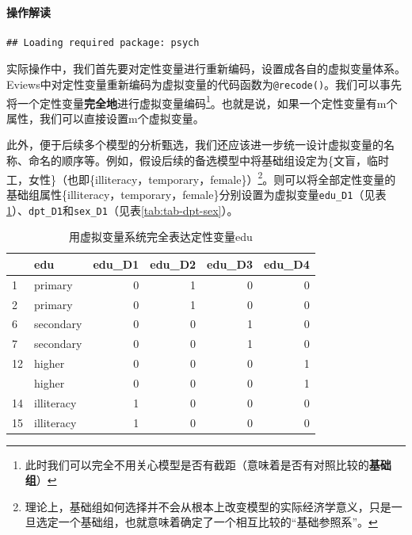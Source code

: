 \documentclass[12pt,(landscape,a4paper),(portrait,a4paper)]{article}
\let\oldparagraph\paragraph
\renewcommand{\paragraph}[1]{\oldparagraph{#1}\mbox{}}
\let\rmarkdownfootnote\footnote%
\def\footnote{\protect\rmarkdownfootnote}
\theoremstyle{definition}
\theoremstyle{definition}
\theoremstyle{definition}
\theoremstyle{remark}
\begin{document}
\paragraph{操作解读}

\begin{verbatim}
## Loading required package: psych
\end{verbatim}

实际操作中，我们首先要对定性变量进行重新编码，设置成各自的虚拟变量体系。Eviews中对定性变量重新编码为虚拟变量的代码函数为\texttt{@recode()}。我们可以事先将一个定性变量\textbf{完全地}进行虚拟变量编码\footnote{此时我们可以完全不用关心模型是否有截距（意味着是否有对照比较的\textbf{基础组}）}。也就是说，如果一个定性变量有m个属性，我们可以直接设置m个虚拟变量。

此外，便于后续多个模型的分析甄选，我们还应该进一步统一设计虚拟变量的名称、命名的顺序等。例如，假设后续的备选模型中将基础组设定为\{文盲，临时工，女性\}（也即\{illiteracy，temporary，female\}）\footnote{理论上，基础组如何选择并不会从根本上改变模型的实际经济学意义，只是一旦选定一个基础组，也就意味着确定了一个相互比较的``基础参照系''。}。则可以将全部定性变量的基础组属性\{illiteracy，temporary，female\}分别设置为虚拟变量\texttt{edu\_D1}（见表\ref{tab:tab-edu}）、\texttt{dpt\_D1}和\texttt{sex\_D1}（见表\ref{tab:tab-dpt-sex}）。

\begin{table}

\caption{\label{tab:tab-edu}用虚拟变量系统完全表达定性变量edu}
\centering
\begin{tabular}[t]{llrrrr}
\toprule
  & edu & edu\_D1 & edu\_D2 & edu\_D3 & edu\_D4\\
\midrule
1 & primary & 0 & 1 & 0 & 0\\
2 & primary & 0 & 1 & 0 & 0\\
6 & secondary & 0 & 0 & 1 & 0\\
7 & secondary & 0 & 0 & 1 & 0\\
12 & higher & 0 & 0 & 0 & 1\\
\addlinespace
13 & higher & 0 & 0 & 0 & 1\\
14 & illiteracy & 1 & 0 & 0 & 0\\
15 & illiteracy & 1 & 0 & 0 & 0\\
\bottomrule
\end{tabular}
\end{table}
\end{document}
